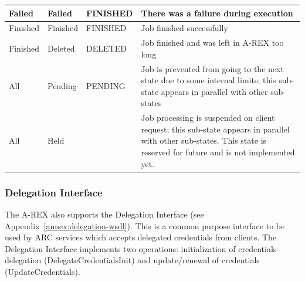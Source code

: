 \documentclass{article}                            %
\begin{document}
\begin{table}
\begin{tabular}{|>{\centering}p{}|>{\centering}p{}|>{\centering}p{}|p{}|}
Failed& Failed& FINISHED& There was a failure during execution\\ \hline 
Finished& Finished& FINISHED& Job finished successfully\\ \hline 
Finished& Deleted& DELETED& Job finished and was left in A-REX too long\\ \hline 
All& Pending& PENDING&
Job is prevented from going to the next state due to some internal
limits; this sub-state appears in parallel with other sub-states\\ \hline 
All& Held& &
Job processing is suspended on client request; this sub-state appears
in parallel with other sub-states. This state is reserved for future
and is not implemented yet.\\ \hline
\end{tabular}
\end{table}

\subsubsection{Delegation Interface}

The A-REX also supports the Delegation Interface (see Appendix~\ref{annex:delegation-wsdl}).
This is a common purpose interface to be used by ARC services which
accepts delegated credentials from clients. The Delegation Interface
implements two operations: initialization of credentials delegation
(DelegateCredentialsInit) and update/renewal of credentials (UpdateCredentials).
\end{document}
